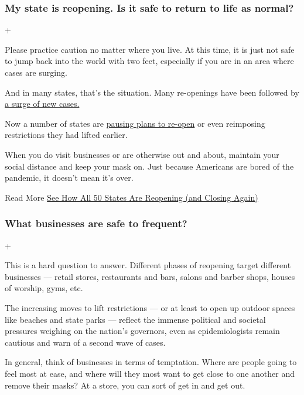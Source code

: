 \hypertarget{my-state-is-reopening-is-it-safe-to-return-to-life-as-normal}{%
\subsubsection{My state is reopening. Is it safe to return to life as
normal?}\label{my-state-is-reopening-is-it-safe-to-return-to-life-as-normal}}

+

Please practice caution no matter where you live. At this time, it is
just not safe to jump back into the world with two feet, especially if
you are in an area where cases are surging.

And in many states, that's the situation. Many re-openings have been
followed by
\href{https://www.nytimes3xbfgragh.onion/interactive/2020/07/09/us/coronavirus-cases-reopening-trends.html}{a
surge of new cases.}

Now a number of states are
\href{https://www.nytimes3xbfgragh.onion/2020/06/25/us/texas-coronavirus-cases-reopening-Greg-Abbott.html}{pausing
plans to re-open} or even reimposing restrictions they had lifted
earlier.

When you do visit businesses or are otherwise out and about, maintain
your social distance and keep your mask on. Just because Americans are
bored of the pandemic, it doesn't mean it's over.

Read More
\href{https://www.nytimes3xbfgragh.onion/interactive/2020/us/states-reopen-map-coronavirus.html}{See
How All 50 States Are Reopening (and Closing Again)}

\hypertarget{what-businesses-are-safe-to-frequent}{%
\subsubsection{What businesses are safe to
frequent?}\label{what-businesses-are-safe-to-frequent}}

+

This is a hard question to answer. Different phases of reopening target
different businesses --- retail stores, restaurants and bars, salons and
barber shops, houses of worship, gyms, etc.

The increasing moves to lift restrictions --- or at least to open up
outdoor spaces like beaches and state parks --- reflect the immense
political and societal pressures weighing on the nation's governors,
even as epidemiologists remain cautious and warn of a second wave of
cases.

In general, think of businesses in terms of temptation. Where are people
going to feel most at ease, and where will they most want to get close
to one another and remove their masks? At a store, you can sort of get
in and get out.

